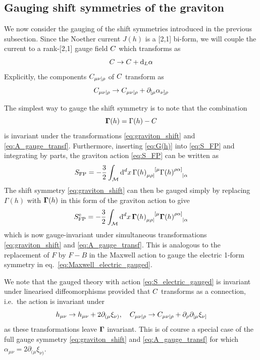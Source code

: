 \subsection{Gauging shift symmetries of the graviton}
\label{sec:gauging_graviton_shifts}

We now consider the gauging of the shift symmetries introduced in the previous subsection. Since the Noether current $J(h)$ is a [2,1] bi-form,
we will couple the current to a rank-[2,1] gauge field $C$ which transforms as
\begin{equation}\label{eq:A_gauge_transf}
    C \to C+\dd_L \alpha
\end{equation}
Explicitly, the components $C_{\mu\nu|\rho}$ of $C$ transform as 
\begin{equation}
     C_{\mu\nu|\rho} \to C_{\mu\nu|\rho} +  \partial_{[\mu} \alpha_{\nu]\rho}
\end{equation}

The simplest way to gauge the shift symmetry is to note that the combination 
\begin{equation}\label{eq:ggamma}
    \mathbf{\Gamma}(h) = \Gamma(h) - C
\end{equation}
is invariant under the transformations \eqref{eq:graviton_shift} and \eqref{eq:A_gauge_transf}. Furthermore, inserting \eqref{eq:G(h)} into \eqref{eq:S_FP} and integrating by parts, the graviton action \eqref{eq:S_FP} can be written as
\begin{equation}\label{eq:S_FP_Gamma}
    S_{\text{FP}} = -\frac{3}{2} \int_{\mathcal{M}} \dd[d]{x} \Gamma(h)\indices{_{\mu\rho|}^{[\mu}} \Gamma(h)\indices{^{\rho\alpha]}_{|\alpha}}
\end{equation}
The shift symmetry \eqref{eq:graviton_shift} can then be gauged simply by replacing $\Gamma(h)$ with $\mathbf{\Gamma}(h)$ in this form of the graviton action to give
\begin{equation}\label{eq:S_electric_gauged}
    S^{\text{e}}_{\text{FP}} = -\frac{3}{2} \int_{\mathcal{M}} \dd[d]{x} \ggamma(h)\indices{_{\mu\rho|}^{[\mu}} \ggamma(h)\indices{^{\rho\alpha]}_{|\alpha}}
\end{equation}
which is now gauge-invariant under simultaneous transformations \eqref{eq:graviton_shift} and \eqref{eq:A_gauge_transf}.
This is analogous to the replacement of $F$ by $F-B$ in the Maxwell action to gauge the electric 1-form symmetry in eq.~\eqref{eq:Maxwell_electric_gauged}. 

We note that the gauged theory with action \eqref{eq:S_electric_gauged} is invariant under linearised diffeomorphisms provided that $C$ transforms as a connection, i.e.\ the action is invariant under
\begin{equation}
\label{Cdiff}
    h_{\mu\nu} \to h_{\mu\nu} + 2\partial_{(\mu}\xi_{\nu)}\qc \gaugefield_{\mu\nu|\rho} \to \gaugefield_{\mu\nu|\rho} + \partial_\rho \partial_{[\mu}\xi_{\nu]}
\end{equation}
as these transformations leave $\mathbf{\Gamma}$ invariant. This is of course a special case of the full gauge symmetry \eqref{eq:graviton_shift} and \eqref{eq:A_gauge_transf} for which $\alpha_{\mu\nu} = 2 \partial_{(\mu}\xi_{\nu)}$.